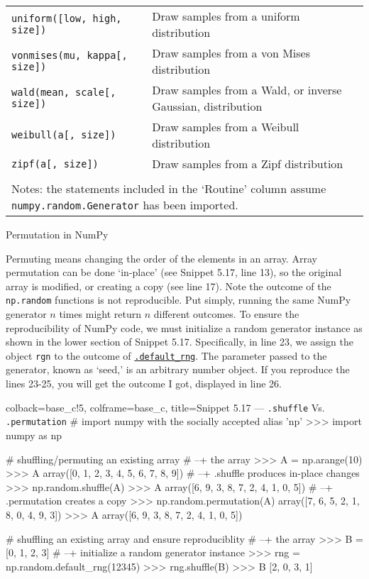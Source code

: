 \documentclass[a4paper,11pt]{book}
\numberwithin{figure}{chapter}
\numberwithin{table}{chapter}
\newcommand{\question}[1]{%
    \begin{tcolorbox}[colback=comp_c!10,colframe=comp_c,sidebyside align=top,width=\linewidth,before skip=1ex]
        #1
    \end{tcolorbox}
    \switchcolumn%
}
\newcommand{\note}[1]{%
    \begin{tcolorbox}[colback=white!0,colframe=white!10,width=\linewidth,before skip=1ex]
        #1
    \end{tcolorbox}
}
\begin{document}
\begin{sidewaystable}[!htbp]
\begin{tabular}{lp{12cm}}
\texttt{uniform([low, high, size])} &
                        Draw samples from a uniform distribution\\
\texttt{vonmises(mu, kappa[, size])} &
                        Draw samples from a von Mises distribution\\
\texttt{wald(mean, scale[, size])} &
                        Draw samples from a Wald, or inverse Gaussian, distribution\\
\texttt{weibull(a[, size])} &
                        Draw samples from a Weibull distribution\\
\texttt{zipf(a[, size])} &
                        Draw samples from a Zipf distribution\\
	     	\bottomrule \\[-1.8ex]
	        \multicolumn{2}{l}{Notes: the statements included in the `Routine' column assume \texttt{numpy.random.Generator} has been imported.} \\
	\end{tabular}
\end{sidewaystable}
\clearpage

\begin{paracol}{2}
	\question{\raggedright Permutation in NumPy}
	\note{Permuting means changing the order of the elements in an array. Array permutation can be done `in-place' (see Snippet 5.17, line 13), so the original array is modified, or creating a copy (see line 17). Note the outcome of the \texttt{np.random} functions is not reproducible. Put simply, running the same NumPy generator $n$ times might return $n$ different outcomes. To ensure the reproducibility of NumPy code, we must initialize a random generator instance as shown in the lower section of Snippet 5.17. Specifically, in line 23, we assign the object \texttt{rgn} to the outcome of \href{https://numpy.org/doc/stable/reference/random/generator.html#numpy.random.Generator}{\texttt{.default\_rng}}. The parameter passed to the generator, known as `seed,' is an arbitrary number object. If you reproduce the lines 23-25, you will get the outcome I got, displayed in line 26.}
\end{paracol}

\begin{pythoncode}[linenos=true,]{colback=base_c!5, colframe=base_c, title=\sffamily Snippet 5.17 --- \texttt{.shuffle} Vs. \texttt{.permutation}}
# import numpy with the socially accepted alias 'np'
>>> import numpy as np

# shuffling/permuting an existing array
# --+ the array
>>> A = np.arange(10)
>>> A
array([0, 1, 2, 3, 4, 5, 6, 7, 8, 9])
# --+ .shuffle produces in-place changes
>>> np.random.shuffle(A)
>>> A
array([6, 9, 3, 8, 7, 2, 4, 1, 0, 5])
# --+ .permutation creates a copy
>>> np.random.permutation(A)
array([7, 6, 5, 2, 1, 8, 0, 4, 9, 3])
>>> A
array([6, 9, 3, 8, 7, 2, 4, 1, 0, 5])

# shuffling an existing array and ensure reproduciblity
# --+ the array
>>> B = [0, 1, 2, 3]
# --+ initialize a random generator instance
>>> rng = np.random.default_rng(12345)
>>> rng.shuffle(B)
>>> B
[2, 0, 3, 1]
\end{pythoncode}
\clearpage
\end{document}

